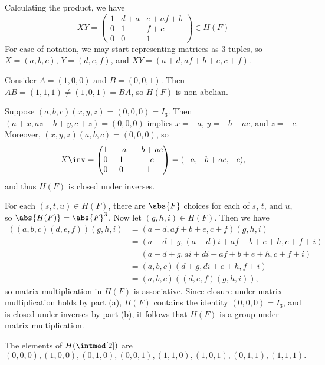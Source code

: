 \begin{solenum}
    \item Calculating the product, we have
    \[
        XY = 
        \begin{pmatrix}
            1 & d + a & e + af + b \\
            0 & 1 & f + c \\
            0 & 0 & 1
        \end{pmatrix} \in H(F)
    \]
    For ease of notation, we may start representing matrices as $3$-tuples, so $X = (a, b, c)$, $Y = (d, e, f)$, and $XY = (a + d, af + b + e, c + f)$.

    Consider $A = (1, 0, 0)$ and $B = (0, 0, 1)$.
    Then $AB = (1, 1, 1) \neq (1, 0, 1) = BA$, so $H(F)$ is non-abelian.
    \item Suppose $(a, b, c)(x, y, z) = (0, 0, 0) = I_3$.
	Then $(a + x, az + b + y, c + z) = (0, 0, 0)$ implies $x = -a$, $y = -b + ac$, and $z = -c$.
    Moreover, $(x, y, z)(a, b, c) = (0, 0, 0)$, so
    \[
        X\inv = 
        \begin{pmatrix}
            1 & -a & -b + ac \\
            0 & 1 & -c \\
            0 & 0 & 1
        \end{pmatrix} = (-a, -b + ac, -c),
    \]
    and thus $H(F)$ is closed under inverses.
    \item For each $(s, t, u) \in H(F)$, there are $\abs{F}$ choices for each of $s$, $t$, and $u$, so $\abs{H(F)} = \abs{F}^3$.
	Now let $(g, h, i) \in H(F)$.
	Then we have
    \begin{align*}
        ((a, b, c)(d, e, f))(g, h, i) & = (a + d, af + b + e, c + f)(g, h, i) \\
        & = (a + d + g, (a + d)i + af + b + e + h, c + f + i) \\
        & = (a + d + g, ai + di + af + b + e + h, c + f + i) \\
        & = (a, b, c)(d + g, di + e + h, f + i) \\
        & = (a, b, c)((d, e, f)(g, h, i)),
    \end{align*}
    so matrix multiplication in $H(F)$ is associative.
    Since closure under matrix multiplication holds by part (a), $H(F)$ contains the identity $(0, 0, 0) = I_3$, and is closed under inverses by part (b), it follows that $H(F)$ is a group under matrix multiplication.
    \item The elements of $H(\intmod[2])$ are
    \[
    	 (0, 0, 0), (1, 0, 0), (0, 1, 0), (0, 0, 1), (1, 1, 0), (1, 0, 1), (0, 1, 1), (1, 1, 1).
\]
\end{solenum}

